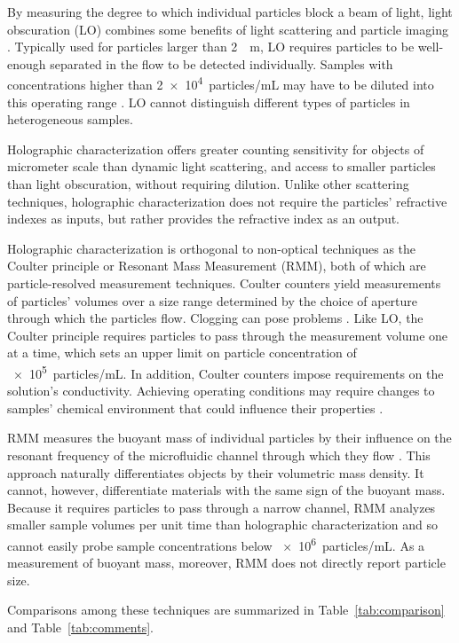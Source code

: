 By measuring the degree to which individual particles block a
beam of light, light obscuration (LO) combines some benefits of
light scattering and particle imaging \cite{demeule10,zolls13}. 
Typically used for 
particles larger than \SI{2}{\mu m}, LO requires particles to be well-enough
separated in the flow to be detected individually. Samples with
concentrations higher than \SI{2e4}{particles/mL} may have to be diluted into this operating range \cite{demeule10}. LO cannot distinguish different types of particles in heterogeneous samples.

Holographic characterization offers greater counting sensitivity for objects of micrometer scale 
than dynamic light scattering, and access to smaller particles
than light obscuration, without requiring dilution.
Unlike other scattering techniques, holographic characterization
does not require the particles' refractive indexes as inputs, but
rather provides the refractive index as an output.

Holographic characterization is orthogonal to non-optical techniques
as the Coulter principle or Resonant Mass Measurement (RMM), both of which are
particle-resolved measurement techniques. Coulter counters yield
measurements of particles' volumes over a size range determined
by the choice of aperture through which the particles flow. Clogging 
can pose problems \cite{demeule10}. Like LO, the Coulter principle requires
particles to pass through the measurement volume one at a time,
which sets an upper limit on particle concentration of 
\SI{e5}{particles/mL}. In addition, Coulter counters 
impose requirements on
the solution's conductivity. Achieving operating conditions may
require changes to samples' chemical environment that could influence 
their properties \cite{demeule10}.

RMM measures the buoyant mass of individual particles by their
influence on the resonant frequency of the microfluidic channel
through which they flow \cite{zolls13,weinbuch13,panchal14}. 
This approach naturally differentiates 
objects by their volumetric mass density. It cannot, however, differentiate materials with the same sign of the buoyant mass. Because it requires
particles to pass through a narrow channel, RMM analyzes smaller
sample volumes per unit time than holographic characterization
and so cannot easily probe sample concentrations below 
\SI{e6}{particles/mL}. As a measurement of buoyant mass, moreover, RMM
does not directly report particle size.

Comparisons among these techniques are summarized
in Table~\ref{tab:comparison} and Table~\ref{tab:comments}.


